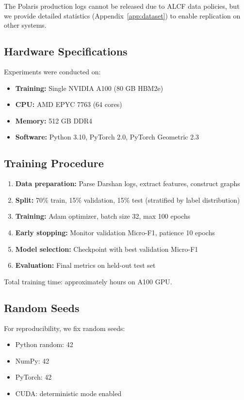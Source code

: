 The Polaris production logs cannot be released due to ALCF data policies, but we provide detailed statistics (Appendix~\ref{app:dataset}) to enable replication on other systems.

\subsection{Hardware Specifications}

Experiments were conducted on:
\begin{itemize}
    \item \textbf{Training:} Single NVIDIA A100 (80 GB HBM2e)
    \item \textbf{CPU:} AMD EPYC 7763 (64 cores)
    \item \textbf{Memory:} 512 GB DDR4
    \item \textbf{Software:} Python 3.10, PyTorch 2.0, PyTorch Geometric 2.3
\end{itemize}

\subsection{Training Procedure}

\begin{enumerate}
    \item \textbf{Data preparation:} Parse Darshan logs, extract features, construct graphs
    \item \textbf{Split:} 70\% train, 15\% validation, 15\% test (stratified by label distribution)
    \item \textbf{Training:} Adam optimizer, batch size 32, max 100 epochs
    \item \textbf{Early stopping:} Monitor validation Micro-F1, patience 10 epochs
    \item \textbf{Model selection:} Checkpoint with best validation Micro-F1
    \item \textbf{Evaluation:} Final metrics on held-out test set
\end{enumerate}

Total training time: approximately  hours on A100 GPU.

\subsection{Random Seeds}

For reproducibility, we fix random seeds:
\begin{itemize}
    \item Python random: 42
    \item NumPy: 42
    \item PyTorch: 42
    \item CUDA: deterministic mode enabled
\end{itemize}

